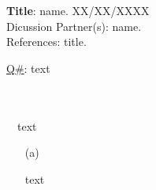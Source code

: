 \documentclass{article}
\begin{document}
\begin{center} %
    \textbf{Title}: name. XX/XX/XXXX\\
    Dicussion Partner(s): name.\\
    References: title.
\end{center}
\noindent
\underline{Q\#}: text\\ %
\\\\
\ \ text\\
\begin{itemize} %
    \item[(a)] 
    text
\end{itemize}
\end{document}
